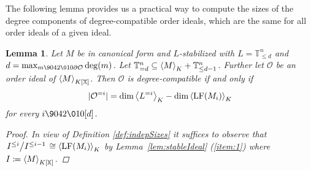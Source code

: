 \documentclass[11pt,oneside,english]{amsart}
\makeatletter
\numberwithin{equation}{section}
\numberwithin{figure}{section}
\theoremstyle{plain}
\theoremstyle{definition}
\theoremstyle{definition}
\theoremstyle{remark}
\theoremstyle{plain}
\newtheorem{lem}[thm]{Lemma}
\theoremstyle{plain}
\theoremstyle{plain}
\theoremstyle{problem@}
\makeatother
\begin{document}
The following lemma provides us a practical way to compute
the sizes of the degree components of degree-compatible order ideals,
which are the same for all order ideals of a given ideal.
\begin{lem}
\label{lem:stableRepresentation}
Let
$M$ be in canonical form and $L$-stabilized with $L={\mathbb{T}}_{\leq d}^{n}$
and $d=\max_{m{\9042\010}\partial{\mathcal{O}}}\deg(m)$.
Let \({\mathbb{T}}^{n}_{=d} \subseteq {{\left\langle {M}\right\rangle}\sb{K}} + {\mathbb{T}}^{n}_{\leq d-1}\).
Further let ${\mathcal{O}}$ be an order ideal of ${{\left\langle {M}\right\rangle}\sb{K[\mathbb{X}]}}$.
Then ${\mathcal{O}}$ is degree-compatible if and only if \[
\lvert {\mathcal{O}}^{=i} \rvert =\dim{{\left\langle {L^{=i}}\right\rangle}\sb{K}}-\dim{{\left\langle {\operatorname{LF}(M_{i})}\right\rangle}\sb{K}}\]
for every \(i {\9042\010} [d]\).

\begin{proof}
In view of Definition \ref{def:indepSizes} it suffices to observe
that $\left. I^{\leq i} \middle/ I^{\leq i-1} \right.\cong{{\left\langle {\operatorname{LF}(M_{i})}\right\rangle}\sb{K}}$
by Lemma~\ref{lem:stableIdeal} (\ref{item:1})
where \(I \coloneqq {{\left\langle {M}\right\rangle}\sb{K[\mathbb{X}]}}\).
\end{proof}
\end{lem}
\end{document}
